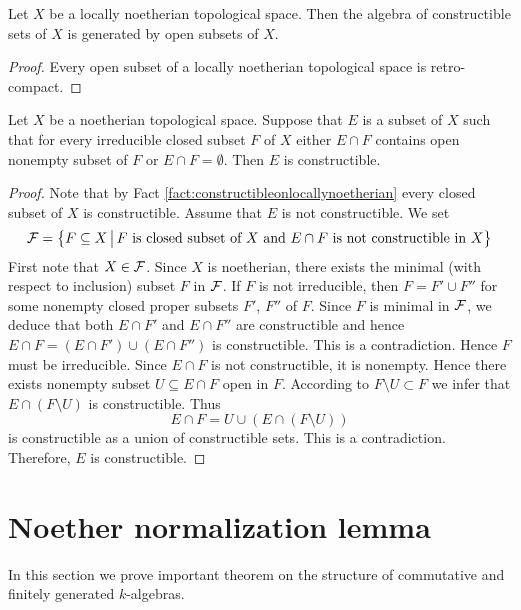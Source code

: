 \begin{fact}\label{fact:constructibleonlocallynoetherian}
Let $X$ be a locally noetherian topological space. Then the algebra of constructible sets of $X$ is generated by open subsets of $X$.
\end{fact}
\begin{proof}
Every open subset of a locally noetherian topological space is retro-compact.
\end{proof}

\begin{proposition}\label{proposition:criterionofconstructiblenoetherian}
Let $X$ be a noetherian topological space. Suppose that $E$ is a subset of $X$ such that for every irreducible closed subset $F$ of $X$ either $E\cap F$ contains open nonempty subset of $F$ or $E\cap F = \emptyset$. Then $E$ is constructible.
\end{proposition}
\begin{proof}
Note that by Fact \ref{fact:constructibleonlocallynoetherian} every closed subset of $X$ is constructible. Assume that $E$ is not constructible. We set
$${\mathcal F} = \big\{F\subseteq X\,\big|\,F\mbox{ is closed subset of }X\mbox{ and }E\cap F\mbox{ is not constructible in }X\big\}$$
First note that $X\in {\mathcal F}$. Since $X$ is noetherian, there exists the minimal (with respect to inclusion) subset $F$ in ${\mathcal F}$. If $F$ is not irreducible, then $F = F'\cup F''$ for some nonempty closed proper subsets $F'$, $F''$ of $F$. Since $F$ is minimal in ${\mathcal F}$, we deduce that both $E\cap F'$ and $E\cap F''$ are constructible and hence $E\cap F  = \left(E\cap F'\right)\cup \left(E\cap F''\right)$ is constructible. This is a contradiction. Hence $F$ must be irreducible. Since $E\cap F$ is not constructible, it is nonempty. Hence there exists nonempty subset $U\subseteq E\cap F$ open in $F$. According to $F\setminus U \subset F$ we infer that $E\cap \left(F\setminus U\right)$ is constructible. Thus
$$E\cap F = U\cup \left(E\cap \left(F\setminus U\right)\right)$$
is constructible as a union of constructible sets. This is a contradiction. Therefore, $E$ is constructible.
\end{proof}

\section{Noether normalization lemma}
\noindent
In this section we prove important theorem on the structure of commutative and finitely generated $k$-algebras.


